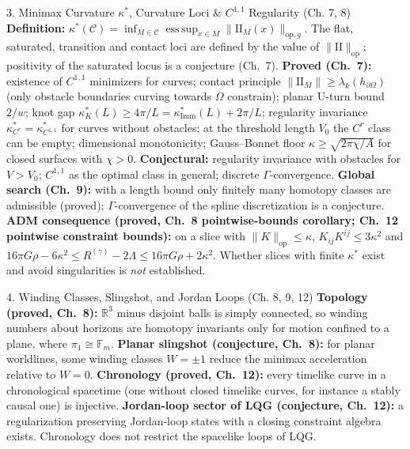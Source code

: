 \documentclass[11pt,a4paper,oneside]{article}
\newcommand{\II}{\mathrm{II}}
\begin{document}
\begin{conceptbox}{{3. Minimax Curvature $\kappa^*$, Curvature Loci \& $C^{1,1}$ Regularity (Ch. 7, 8)}}
\textbf{Definition:} $\kappa^*(\mathcal{C}) = \inf_{M \in \mathcal{C}} \operatorname{ess\,sup}_{x \in M} \|\II_M(x)\|_{\mathrm{op}, g}$. The flat, saturated, transition and contact loci are defined by the value of $\|\II\|_{\mathrm{op}}$; positivity of the saturated locus is a conjecture (Ch.~7).
\textbf{Proved (Ch.~7):} existence of $C^{1,1}$ minimizers for curves; contact principle $\|\II_M\| \ge \lambda_k(h_{\partial\Omega})$ (only obstacle boundaries curving towards $\Omega$ constrain); planar U-turn bound $2/w$; knot gap $\kappa^*_K(L) \ge 4\pi/L = \kappa^*_{\mathrm{Imm}}(L) + 2\pi/L$; regularity invariance $\kappa^*_{C^r} = \kappa^*_{C^{1,1}}$ for curves without obstacles; at the threshold length $V_0$ the $C^r$ class can be empty; dimensional monotonicity; Gauss--Bonnet floor $\kappa \ge \sqrt{2\pi\chi/A}$ for closed surfaces with $\chi > 0$. \textbf{Conjectural:} regularity invariance with obstacles for $V > V_0$; $C^{1,1}$ as the optimal class in general; discrete $\Gamma$-convergence.
\textbf{Global search (Ch.~9):} with a length bound only finitely many homotopy classes are admissible (proved); $\Gamma$-convergence of the spline discretization is a conjecture.
\textbf{ADM consequence (proved, Ch.~8 pointwise-bounds corollary; Ch.~12 pointwise constraint bounds):} on a slice with $\|K\|_{\mathrm{op}} \le \kappa$, $K_{ij}K^{ij} \le 3\kappa^2$ and $16\pi G\rho - 6\kappa^2 \le R^{(\gamma)} - 2\Lambda \le 16\pi G\rho + 2\kappa^2$. Whether slices with finite $\kappa^*$ exist and avoid singularities is \emph{not} established.
\end{conceptbox}

\begin{conceptbox}{{4. Winding Classes, Slingshot, and Jordan Loops (Ch. 8, 9, 12)}}
\textbf{Topology (proved, Ch.~8):} $\mathbb{R}^3$ minus disjoint balls is simply connected, so winding numbers about horizons are homotopy invariants only for motion confined to a plane, where $\pi_1 \cong \mathbb{F}_m$.
\textbf{Planar slingshot (conjecture, Ch.~8):} for planar worldlines, some winding classes $W = \pm 1$ reduce the minimax acceleration relative to $W = 0$.
\textbf{Chronology (proved, Ch.~12):} every timelike curve in a chronological spacetime (one without closed timelike curves, for instance a stably causal one) is injective. \textbf{Jordan-loop sector of LQG (conjecture, Ch.~12):} a regularization preserving Jordan-loop states with a closing constraint algebra exists. Chronology does not restrict the spacelike loops of LQG.
\end{conceptbox}
\end{document}
